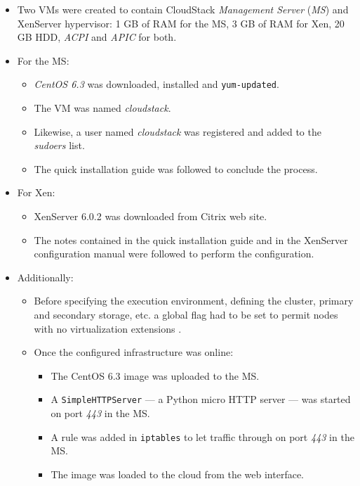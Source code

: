 \begin{itemize}
 \item Two VMs were created to contain CloudStack \emph{Management Server} (\emph{MS}) and XenServer hypervisor: 1 GB of RAM for the MS, 3 GB of RAM for Xen, 20 GB HDD, \emph{ACPI} and \emph{APIC} for both.
 \item For the MS:
  \begin{itemize}
   \item \emph{CentOS 6.3} was downloaded, installed and \texttt{yum-updated}.
   \item The VM was named \emph{cloudstack}.
   \item Likewise, a user named \emph{cloudstack} was registered and added to the \emph{sudoers} list.
   \item The quick installation guide was followed to conclude the process.
  \end{itemize}
 \item For Xen:
  \begin{itemize}
   \item XenServer 6.0.2 was downloaded from Citrix web site.
   \item The notes contained in the quick installation guide and in the XenServer configuration manual \cite{xenserinstall} were followed to perform the configuration.
  \end{itemize}
  \item Additionally:
   \begin{itemize}
    \item Before specifying the execution environment, defining the cluster, primary and secondary storage, etc. a global flag had to be set to permit nodes with no virtualization extensions \cite{cloudstacknohvm}.
    \item Once the configured infrastructure was online:
     \begin{itemize}
      \item The CentOS 6.3 image was uploaded to the MS.
      \item A \texttt{SimpleHTTPServer} --- a Python micro HTTP server --- was started on port \emph{443} in the MS.
      \item A rule was added in \texttt{iptables} to let traffic through on port \emph{443} in the MS.
      \item The image was loaded to the cloud from the web interface.
     \end{itemize}
   \end{itemize}
\end{itemize}

